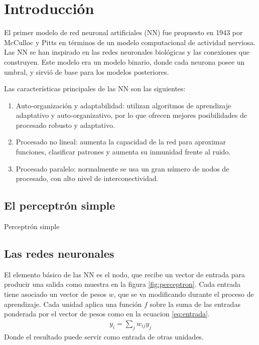 

\section{Introducción}
El primer modelo de red neuronal artificiales (NN) fue propuesto en 1943 por McCulloc y Pitts en términos de un modelo computacional de actividad nerviosa. Las NN se han inspirado en las redes neuronales biológicas y las conexiones que construyen. Este modelo era un modelo binario, donde cada neurona posee un umbral, y sirvió de base para los modelos posteriores.

Las características principales de las NN son las siguientes:
\begin{enumerate}
	\item Auto-organización y adaptabilidad: utilizan algoritmos de aprendizaje adaptativo y auto-organizativo, por lo que ofrecen mejores posibilidades de procesado robusto y adaptativo.

	\item Procesado no lineal: aumenta la capacidad de la red para aproximar funciones, clasificar patrones y aumenta su inmunidad frente al ruido.

	\item Procesado paralelo: normalmente se usa un gran número de nodos de procesado, con alto nivel de interconectividad.
\end{enumerate}

\subsection{El perceptrón simple}
\begin{imagen}
	\scalebox{1.5}{}
	\caption{Perceptrón simple}
	\label{fig:perceptron}
\end{imagen}

\subsection{Las redes neuronales}
El elemento básico de las NN es el nodo, que recibe un vector de entrada para producir una salida como muestra en la figura \ref{fig:perceptron}. Cada entrada tiene asociado un vector de pesos $w$, que se va modificando durante el proceso de aprendizaje. Cada unidad aplica una función $f$ sobre la suma de las entradas ponderada por el vector de pesos como en la ecuacion \ref{eq:entrada}.
\begin{eqnarray}
	y_{i} = \sum_{j} w_{ij}y_{j}\label{eq:entrada}
\end{eqnarray}
Donde el resultado puede servir como entrada de otras unidades.

